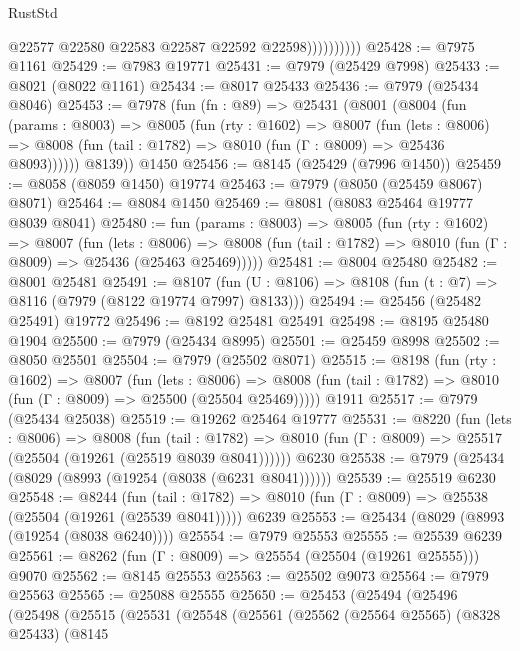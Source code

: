 \begin{lexlean}{RustStd}
\begin{coremodule}
                        @22577
                        @22580
                        @22583
                        @22587
                        @22592
                        @22598))))))))))
@25428 := @7975 @1161
@25429 := @7983 @19771
@25431 := @7979 (@25429 @7998)
@25433 := @8021 (@8022 @1161)
@25434 := @8017 @25433
@25436 := @7979 (@25434 @8046)
@25453 := @7978
    (fun (fn : @89) =>
    @25431
      (@8001
        (@8004
          (fun (params : @8003) =>
          @8005
            (fun (rty : @1602) =>
            @8007
              (fun (lets : @8006) =>
              @8008 (fun (tail : @1782) => @8010 (fun (Γ : @8009) => @25436 @8093))))))
        @8139))
    @1450
@25456 := @8145 (@25429 (@7996 @1450))
@25459 := @8058 (@8059 @1450) @19774
@25463 := @7979 (@8050 (@25459 @8067) @8071)
@25464 := @8084 @1450
@25469 := @8081 (@8083 @25464 @19777 @8039 @8041)
@25480 := fun (params : @8003) =>
  @8005
    (fun (rty : @1602) =>
    @8007
      (fun (lets : @8006) =>
      @8008 (fun (tail : @1782) => @8010 (fun (Γ : @8009) => @25436 (@25463 @25469)))))
@25481 := @8004 @25480
@25482 := @8001 @25481
@25491 := @8107
    (fun (U : @8106) => @8108 (fun (t : @7) => @8116 (@7979 (@8122 @19774 @7997) @8133)))
@25494 := @25456 (@25482 @25491) @19772
@25496 := @8192 @25481 @25491
@25498 := @8195 @25480 @1904
@25500 := @7979 (@25434 @8995)
@25501 := @25459 @8998
@25502 := @8050 @25501
@25504 := @7979 (@25502 @8071)
@25515 := @8198
    (fun (rty : @1602) =>
    @8007
      (fun (lets : @8006) =>
      @8008 (fun (tail : @1782) => @8010 (fun (Γ : @8009) => @25500 (@25504 @25469)))))
    @1911
@25517 := @7979 (@25434 @25038)
@25519 := @19262 @25464 @19777
@25531 := @8220
    (fun (lets : @8006) =>
    @8008
      (fun (tail : @1782) =>
      @8010 (fun (Γ : @8009) => @25517 (@25504 (@19261 (@25519 @8039 @8041))))))
    @6230
@25538 := @7979 (@25434 (@8029 (@8993 (@19254 (@8038 (@6231 @8041))))))
@25539 := @25519 @6230
@25548 := @8244
    (fun (tail : @1782) => @8010 (fun (Γ : @8009) => @25538 (@25504 (@19261 (@25539 @8041)))))
    @6239
@25553 := @25434 (@8029 (@8993 (@19254 (@8038 @6240))))
@25554 := @7979 @25553
@25555 := @25539 @6239
@25561 := @8262 (fun (Γ : @8009) => @25554 (@25504 (@19261 @25555))) @9070
@25562 := @8145 @25553
@25563 := @25502 @9073
@25564 := @7979 @25563
@25565 := @25088 @25555
@25650 := @25453
    (@25494
      (@25496
        (@25498
          (@25515
            (@25531
              (@25548
                (@25561
                  (@25562
                    (@25564 @25565)
                    (@8328 @25433)
                    (@8145

\end{coremodule}
\end{lexlean}
